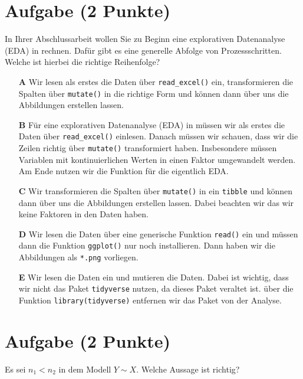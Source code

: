 \documentclass[a4paper, 9pt]{scrartcl}\usepackage[]{graphicx}\usepackage[]{xcolor}
\begin{document}
\section{Aufgabe \hfill (2 Punkte)}



In Ihrer Abschlussarbeit wollen Sie zu Beginn eine explorativen Datenanalyse (EDA) in \Rlogo rechnen. Dafür gibt es eine generelle Abfolge von Prozessschritten. Welche ist hierbei die richtige Reihenfolge?



\begin{enumerate}
\item [\textbf{A} \msquare] Wir lesen als erstes die Daten über \texttt{read\_excel()} ein, transformieren die Spalten über \texttt{mutate()} in die richtige Form und können dann über  uns die Abbildungen erstellen lassen.
\item [\textbf{B} \msquare] Für eine explorativen Datenanalyse (EDA) in \Rlogo müssen wir als erstes die Daten über \texttt{read\_excel()} einlesen. Danach müssen wir schauen, dass wir die Zeilen richtig über \texttt{mutate()} transformiert haben. Insbesondere müssen Variablen mit kontinuierlichen Werten in einen Faktor umgewandelt werden. Am Ende nutzen wir die Funktion  für die eigentlich EDA.
\item [\textbf{C} \msquare] Wir transformieren die Spalten über \texttt{mutate()} in ein \texttt{tibble} und können dann über  uns die Abbildungen erstellen lassen. Dabei beachten wir das wir keine Faktoren in den Daten haben.
\item [\textbf{D} \msquare] Wir lesen die Daten über eine generische Funktion \texttt{read()} ein und müssen dann die Funktion \texttt{ggplot()} nur noch installieren. Dann haben wir die Abbildungen als \texttt{*.png} vorliegen.
\item [\textbf{E} \msquare] Wir lesen die Daten ein und mutieren die Daten. Dabei ist wichtig, dass wir nicht das Paket \texttt{tidyverse} nutzen, da dieses Paket veraltet ist. über die Funktion \texttt{library(tidyverse)} entfernen wir das Paket von der Analyse.
\end{enumerate}

\section{Aufgabe \hfill (2 Punkte)}



Es sei $n_1 < n_2$ in dem Modell $Y \sim X$. Welche Aussage ist richtig?
\end{document}
